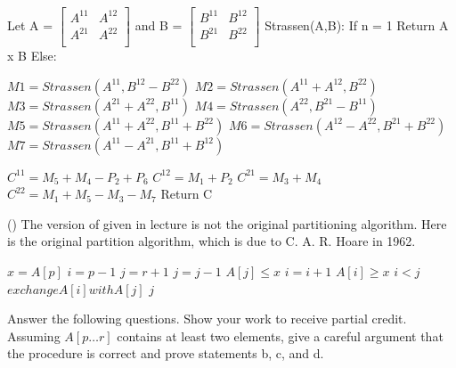 \documentclass[addpoints,11pt]{exam}
\begin{document}
\begin{questions}
\begin{solutionorbox}
	     Let A = $
	     \begin{bmatrix} 
	     	A^{11} & A^{12} \\
	     	A^{21} & A^{22}\\
	     \end{bmatrix}
	     $ and B = $
	     \begin{bmatrix} 
	     	B^{11} & B^{12}  \\
	     	B^{21} & B^{22} \\
	     \end{bmatrix}
	     $ \newline
	     Strassen(A,B): \newline
	     If n = 1 Return A x B \newline
	          Else: \newline
	     
	    $ M1 = Strassen(A^{11}, B^{12} - B^{22})$ \newline
	     $M2 = Strassen(A^{11} + A^{12}, B^{22})$\newline
	    $ M3 = Strassen(A^{21} + A^{22}, B^{11})$\newline
	     $M4 = Strassen(A^{22}, B^{21} - B^{11})$\newline
	    $ M5 = Strassen(A^{11} + A^{22}, B^{11} + B^{22})$\newline
	    $ M6 = Strassen(A^12 - A^{22}, B^{21} + B^{22})$\newline
	    $ M7 = Strassen(A^{11} - A^{21}, B^{11} + B^{12})$\newline
	    
	    $C^{11} = M_5 + M_4 - P_2 + P_6$ \newline
	    $C^{12} = M_1 + P_2$\newline
	    $C^{21} = M_3 + M_4$\newline
	    $C^{22} =M_1 + M_5 - M_3 - M_7 $	\newline
	    Return C     
\end{solutionorbox}

\ifprintanswers
\newpage
\else
\bigskip
\fi


\question (\totalpoints {}) 
The version of  given in lecture is not the original partitioning algorithm.  Here is the original partition algorithm, which is due to C. A. R. Hoare in 1962.
\begin{codebox} 
	\li $x = A[p]$
	\li $i = p - 1$
	\li $j = r + 1$
	\li \While {} \Do
	\li     \Repeat
	\li         $j = j - 1$
	\li     \Until $A[j] \le x$
	\li     \Repeat
	\li         $i = i + 1$
	\li     \Until $A[i] \ge x$
	\li     \If $i < j$ \Then
	\li         $exchange A[i] with A[j]$
	\li     \Else
	\li         \Return $j$
			\End
		\End
\end{codebox}
Answer the following questions.  Show your work to receive partial credit.  Assuming $A[p \dots r]$ contains at least two elements, give a careful argument that the procedure  is correct and prove statements b, c, and d.


\end{questions}
\end{document}
